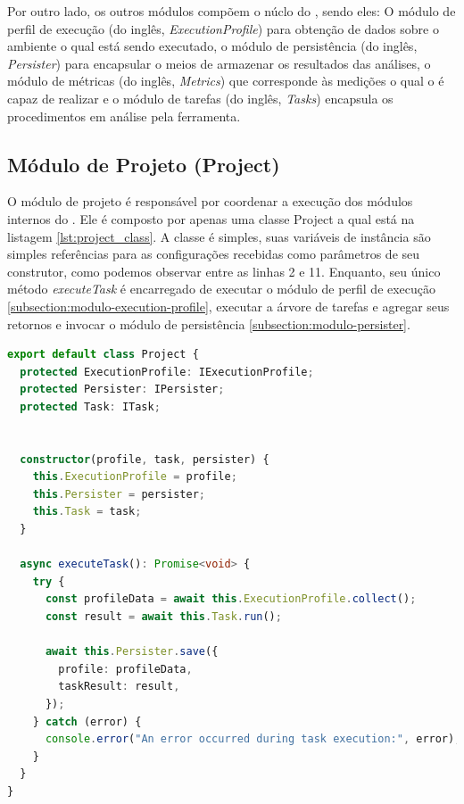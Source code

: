 \documentclass[12pt]{tcc}
\begin{document}
	Por outro lado, os outros módulos compõem o núclo do , sendo eles: O módulo de perfil de execução (do inglês, \emph{ExecutionProfile}) para obtenção de dados sobre o ambiente o qual está sendo executado, o módulo de persistência (do inglês, \emph{Persister}) para encapsular o meios de armazenar os resultados das análises, o módulo de métricas (do inglês, \emph{Metrics}) que corresponde às medições o qual o  é capaz de realizar e o módulo de tarefas (do inglês, \emph{Tasks}) encapsula os procedimentos em análise pela ferramenta.


	\subsection{Módulo de Projeto (Project)}
	\label{subsection:modulo-project}

	O módulo de projeto é responsável por coordenar a execução dos módulos internos do .
	Ele é composto por apenas uma classe Project a qual está na listagem \ref{lst:project_class}.
	A classe é simples, suas variáveis de instância são simples referências para as configurações recebidas como parâmetros de seu construtor, como podemos observar entre as linhas 2 e 11.
	Enquanto, seu único método \emph{executeTask} é encarregado de executar o módulo de perfil de execução \ref{subsection:modulo-execution-profile}, executar a árvore de tarefas e agregar seus retornos e invocar o módulo de persistência \ref{subsection:modulo-persister}.

\begin{minipage}{\linewidth}
\begin{lstlisting}[label={lst:project_class}, caption={Fragmento de códido da classe \emph{Project}.}, language=TypeScript, breaklines=true]
export default class Project {
  protected ExecutionProfile: IExecutionProfile;
  protected Persister: IPersister;
  protected Task: ITask;


  constructor(profile, task, persister) {
    this.ExecutionProfile = profile;
    this.Persister = persister;
    this.Task = task;
  }

  async executeTask(): Promise<void> {
    try {
      const profileData = await this.ExecutionProfile.collect();
      const result = await this.Task.run();
  
      await this.Persister.save({
        profile: profileData,
        taskResult: result,
      });
    } catch (error) {
      console.error("An error occurred during task execution:", error);
    }
  }
}
\end{lstlisting}
\end{minipage}
\end{document}

